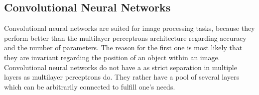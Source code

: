 \subsection{Convolutional Neural Networks}
\label{sec:neural-networks-convolutional-neural-networks}
Convolutional neural networks are suited for image processing tasks, because they perform better than the multilayer perceptrons architecture regarding accuracy and the number of parameters\cite{Lecun98}\cite{LeCun1998cnn}.
The reason for the first one is most likely that they are invariant regarding the position of an object within an image.
Convolutional neural networks do not have a as strict separation in multiple layers as multilayer perceptrons do.
They rather have a pool of several layers which can be arbitrarily connected to fulfill one's needs.



